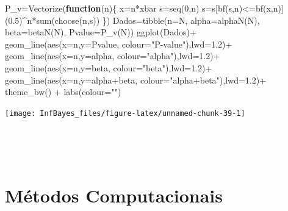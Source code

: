 \documentclass[
]{book}
\newenvironment{Shaded}{\begin{snugshade}}{\end{snugshade}}
\newcommand{\AttributeTok}[1]{\textcolor[rgb]{0.77,0.63,0.00}{#1}}
\newcommand{\ControlFlowTok}[1]{\textcolor[rgb]{0.13,0.29,0.53}{\textbf{#1}}}
\newcommand{\DecValTok}[1]{\textcolor[rgb]{0.00,0.00,0.81}{#1}}
\newcommand{\FloatTok}[1]{\textcolor[rgb]{0.00,0.00,0.81}{#1}}
\newcommand{\FunctionTok}[1]{\textcolor[rgb]{0.00,0.00,0.00}{#1}}
\newcommand{\NormalTok}[1]{#1}
\newcommand{\OtherTok}[1]{\textcolor[rgb]{0.56,0.35,0.01}{#1}}
\newcommand{\SpecialCharTok}[1]{\textcolor[rgb]{0.00,0.00,0.00}{#1}}
\newcommand{\StringTok}[1]{\textcolor[rgb]{0.31,0.60,0.02}{#1}}
\begin{document}
\begin{Shaded}
\begin{Highlighting}[]
\NormalTok{P\_v}\OtherTok{=}\FunctionTok{Vectorize}\NormalTok{(}\ControlFlowTok{function}\NormalTok{(n)\{}
\NormalTok{  x}\OtherTok{=}\NormalTok{n}\SpecialCharTok{*}\NormalTok{xbar}
\NormalTok{  s}\OtherTok{=}\FunctionTok{seq}\NormalTok{(}\DecValTok{0}\NormalTok{,n)}
\NormalTok{  s}\OtherTok{=}\NormalTok{s[}\FunctionTok{bf}\NormalTok{(s,n)}\SpecialCharTok{\textless{}=}\FunctionTok{bf}\NormalTok{(x,n)]}
\NormalTok{  (}\FloatTok{0.5}\NormalTok{)}\SpecialCharTok{\^{}}\NormalTok{n}\SpecialCharTok{*}\FunctionTok{sum}\NormalTok{(}\FunctionTok{choose}\NormalTok{(n,s))}
\NormalTok{\})}
\NormalTok{Dados}\OtherTok{=}\FunctionTok{tibble}\NormalTok{(}\AttributeTok{n=}\NormalTok{N, }\AttributeTok{alpha=}\FunctionTok{alphaN}\NormalTok{(N), }\AttributeTok{beta=}\FunctionTok{betaN}\NormalTok{(N), }\AttributeTok{Pvalue=}\FunctionTok{P\_v}\NormalTok{(N))}
\FunctionTok{ggplot}\NormalTok{(Dados)}\SpecialCharTok{+}
  \FunctionTok{geom\_line}\NormalTok{(}\FunctionTok{aes}\NormalTok{(}\AttributeTok{x=}\NormalTok{n,}\AttributeTok{y=}\NormalTok{Pvalue, }\AttributeTok{colour=}\StringTok{"P{-}value"}\NormalTok{),}\AttributeTok{lwd=}\FloatTok{1.2}\NormalTok{)}\SpecialCharTok{+}
  \FunctionTok{geom\_line}\NormalTok{(}\FunctionTok{aes}\NormalTok{(}\AttributeTok{x=}\NormalTok{n,}\AttributeTok{y=}\NormalTok{alpha, }\AttributeTok{colour=}\StringTok{"alpha"}\NormalTok{),}\AttributeTok{lwd=}\FloatTok{1.2}\NormalTok{)}\SpecialCharTok{+}
  \FunctionTok{geom\_line}\NormalTok{(}\FunctionTok{aes}\NormalTok{(}\AttributeTok{x=}\NormalTok{n,}\AttributeTok{y=}\NormalTok{beta, }\AttributeTok{colour=}\StringTok{"beta"}\NormalTok{),}\AttributeTok{lwd=}\FloatTok{1.2}\NormalTok{)}\SpecialCharTok{+}
  \FunctionTok{geom\_line}\NormalTok{(}\FunctionTok{aes}\NormalTok{(}\AttributeTok{x=}\NormalTok{n,}\AttributeTok{y=}\NormalTok{alpha}\SpecialCharTok{+}\NormalTok{beta, }\AttributeTok{colour=}\StringTok{"alpha+beta"}\NormalTok{),}\AttributeTok{lwd=}\FloatTok{1.2}\NormalTok{)}\SpecialCharTok{+}
  \FunctionTok{theme\_bw}\NormalTok{() }\SpecialCharTok{+} \FunctionTok{labs}\NormalTok{(}\AttributeTok{colour=}\StringTok{""}\NormalTok{)}
\end{Highlighting}
\end{Shaded}

\begin{center}\texttt{[image: InfBayes\_files/figure-latex/unnamed-chunk-39-1]} \end{center}

\(~\)

\(~\)

\hypertarget{Comp}{%
\chapter{Métodos Computacionais}\label{Comp}}
\end{document}

